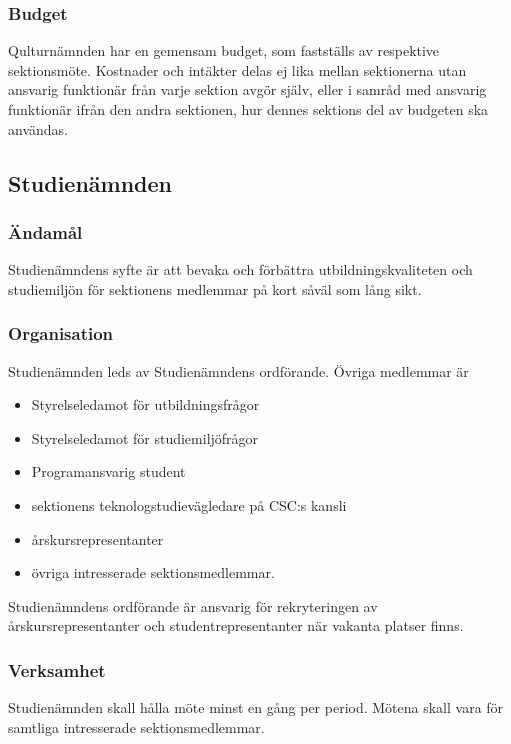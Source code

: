 \documentclass{dgovdoc}
\begin{document}
\subsubsection{Budget}
Qulturnämnden har en gemensam budget, som fastställs av respektive sektionsmöte. Kostnader och intäkter delas ej lika mellan sektionerna utan ansvarig funktionär från varje sektion avgör själv, eller i samråd med ansvarig funktionär ifrån den andra sektionen, hur dennes sektions del av budgeten ska användas.

\subsection{Studienämnden}

\subsubsection{Ändamål}

Studienämndens syfte är att bevaka och förbättra utbildningskvaliteten och
studiemiljön för sektionens medlemmar på kort såväl som lång sikt.

\subsubsection{Organisation}

Studienämnden leds av Studienämndens ordförande. Övriga medlemmar är

\begin{itemize}
  \item Styrelseledamot för utbildningsfrågor
  \item Styrelseledamot för studiemiljöfrågor
  \item Programansvarig student
  \item sektionens teknologstudievägledare på CSC:s kansli
  \item årskursrepresentanter
  \item övriga intresserade sektionsmedlemmar.
\end{itemize}

Studienämndens ordförande är ansvarig för rekryteringen av
årskursrepresentanter och studentrepresentanter när vakanta platser finns.

\subsubsection{Verksamhet}

Studienämnden skall hålla möte minst en gång per period. Mötena skall vara för
samtliga intresserade sektionsmedlemmar.
\end{document}
